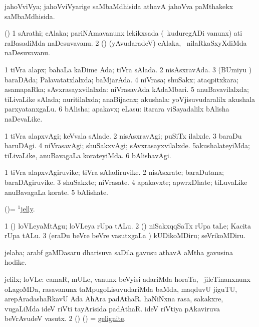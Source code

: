 \bentry
{}
\gl{\gu}
\bmng
ja{hoV}viVya; ja{hoV}viVyarige saMbaMdhisida athavA ja{hoV}va paMthakekx saMbaMdhisida. 
\emng
\eentry

\bentry
{}
\gl{\nA}
\bmng
(\hA) 
\bnum
\num{1} sArathi; cAlaka; pariNAmavanunx lekikxsada (\kanmu\ kuduregADi \mo vanunx) ati raBasadiMda naDesuvavanu. 
\num{2} (\rUpa) (yAvudaradeV) cAlaka, \kanmu\ nilaRkaSxyXdiMda naDesuvavanu. 
\enum
\emng
\eentry

\bentry
{}
\gl{\gu}
\bmng
\bnum
\num{1} tiVra alapx; bahaLa kaDime Ada; tiVra sAlada. 
\num{2} nisAsxravAda. 
\num{3} (BUmiyu \vi) baraDAda; Palavatatxlalxda; baMjarAda. 
\num{4} niVrasa; shuSakx; ataqpitxkara; asamapaRka; sAvxrasayxvilalxda:  niVrasavAda kAdaMbari. 
\num{5} anuBavavilalxda; tiLivaLike sAlada; nuritilalxda; anaBijacnx; akushala:  yoVjisuvudaralilx akushala parxyatanxgaLu. 
\num{6} bAlisha; apakavx; eLasu:  itarara viSayadalilx bAlisha naDevaLike. 
\enum
\emng
\eentry

\bentry
{}
\gl{\kirxvi}
\bmng
\bnum
\num{1} tiVra alapxvAgi; keVvala sAlade. 
\num{2} nisAsxravAgi; puSiTx ilalxde. 
\num{3} baraDu baruDAgi. 
\num{4} niVrasavAgi; shuSakxvAgi; sAvxrasayxvilalxde. 
\num{5}akushalateyiMda; tiLivaLike, anuBavagaLa korateyiMda. 
\num{6} bAlishavAgi. 
\enum
\emng
\eentry

\bentry
{}
\gl{\nA}
\bmng
\bnum
\num{1} tiVra alapxvAgiruvike; tiVra sAladiruvike. 
\num{2} nisAsxrate; baraDutana; baraDAgiruvike. 
\num{3} shuSakxte; niVrasate. 
\num{4} apakavxte; apwrxDhate; tiLuvaLike anuBavagaLa korate. 
\num{5} bAlishate. 
\enum
\emng
\eentry

\bentry
{}
\gl{\nA}
\bmng
(\AmA)=  \hyperlink{jelly(1)}{$^1$jelly}. 
\emng
\eentry

\bentry
{}
\gl{\akirx}
\bmng
\bnum
\num{1} (\AmA) loVLeyaMtAgu; loVLeya rUpa tALu. 
\num{2} (\rUpa) niSakxqqSaTx rUpa taLe; Kacita rUpa tALu. 
\num{3} (eraDu beVre beVre vasutxgaLa \vi) kUDikoMDiru; seVrikoMDiru. 
\enum
\emng
\eentry

\bentry
{}
\gl{\nA}
\bmng
jelaba; arabf gaMDasaru dharisuva saDila gavusu athavA aMtha gavusina hodike. 
\emng
\eentry

\bentry
{}
\gl{\nA}
\bmng
\bnum
{} jelilx; loVLe: 
\banum
{} camaR, mULe, \mo vanunx beVyisi adariMda horaTa, \kanmu\ jileTinanxnunx oLagoMDa, rasavanunx taMpugoLisuvudariMda baMda, maqduvU jiguTU, arepAradashaRkavU Ada AhAra padAthaR. 
 haNiNxna rasa, sakakxre, \mo vugaLiMda ideV riVti tayArisida padAthaR. 
 ideV riVtiya pAkaviruva beVrAvudeV vasutx. 
\eanum
\numie
\num{2} (\birx) (\ashi) = \hyperref{kandict_g.pdf}{G}{gelignite}{gelignite}. 
\enum
\emng
\eentry

